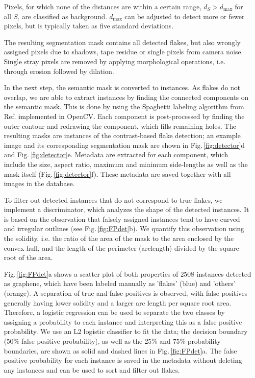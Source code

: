 \documentclass[reprint, prl, superscriptaddress, floatfix]{revtex4-2}
\newcommand{\fig}[1]{Fig.\,\ref{#1}}
\begin{document}
Pixels, for which none of the distances are within a certain range, $d_S > d_{\mathrm{max}}$ for all $S$, are classified as background. 
$d_{\mathrm{max}}$ can be adjusted to detect more or fewer pixels, but is typically taken as five standard deviations.

The resulting segmentation mask contains all detected flakes, but also wrongly assigned pixels due to shadows, tape residue or single pixels from camera noise.
Single stray pixels are removed by applying morphological operations, i.e. through erosion followed by dilation.

In the next step, the semantic mask is converted to instances.
As flakes do not overlap, we are able to extract instances by finding the connected components on the semantic mask.
This is done by using the Spaghetti labeling algorithm from Ref.\cite{Bolelli} implemented in OpenCV. 
Each component is post-processed by finding the outer contour and redrawing the component, which fills remaining holes.
The resulting masks are instances of the contrast-based flake detection; an example image and its corresponding segmentation mask are shown in \fig{fig:detector}d and \fig{fig:detector}e.
Metadata are extracted for each component, which include the size, aspect ratio, maximum and minimum side-lengths as well as the mask itself (\fig{fig:detector}f). 
These metadata are saved together with all images in the database. 

To filter out detected instances that do not correspond to true flakes, we implement a discriminator, which analyzes the shape of the detected instances.
It is based on the observation that falsely assigned instances tend to have curved and irregular outlines (see \fig{fig:FPdet}b). 
We quantify this observation using the solidity, i.e. the ratio of the area of the mask to the area enclosed by the convex hull, and the length of the perimeter (arclength) divided by the square root of the area.

\fig{fig:FPdet}a shows a scatter plot of both properties of 2508 instances detected as graphene, which have been labeled manually as 'flakes' (blue) and 'others' (orange). 
A separation of true and false positives is observed, with false positives generally having lower solidity and a larger arc length per square root area. 
Therefore, a logistic regression can be used to separate the two classes by assigning a probability to each instance and interpreting this as a false positive probability.
We use an L2 logistic classifier to fit the data; the decision boundary (50\% false positive probability), as well as the 25\% and 75\% probability boundaries, are shown as solid and dashed lines in \fig{fig:FPdet}a. 
The false positive probability for each instance is saved in the metadata without deleting any instances and can be used to sort and filter out flakes. 
\end{document}
